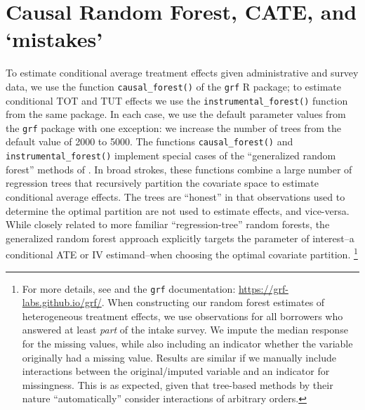 \begin{appendix}
\begin{figure}[!h]
\label{te_rankinvariance}
\end{figure}


\newpage 

\section{ Causal Random Forest, CATE, and `mistakes'}\label{app:cate}


To estimate conditional average treatment effects given administrative and survey data, we use the function \texttt{causal\_forest()} of the \texttt{grf} R package; to estimate conditional TOT and TUT effects we use the \texttt{instrumental\_forest()} function from the same package.
In each case, we use the default parameter values from the \texttt{grf} package with one exception: we increase the number of trees from the default value of 2000 to 5000.
The functions \texttt{causal\_forest()} and \texttt{instrumental\_forest()} implement special cases of the ``generalized random forest'' methods of \cite{atheygrf}.
In broad strokes, these functions combine a large number of regression trees that recursively partition the covariate space to estimate conditional average effects.
The trees are ``honest'' in that observations used to determine the optimal partition are not used to estimate effects, and vice-versa.
While closely related to more familiar ``regression-tree'' random forests, the generalized random forest approach explicitly targets the parameter of interest--a conditional ATE or IV estimand--when choosing the optimal covariate partition.
\footnote{For more details, see \cite{atheygrf} and the \texttt{grf} documentation: \url{https://grf-labs.github.io/grf/}. When constructing our random forest estimates of heterogeneous treatment effects, we use observations for all borrowers who answered at least \emph{part} of the intake survey.
We impute the median response for the missing values, while also including an indicator whether the variable originally had a missing value. Results are similar if we manually include interactions between the original/imputed variable and an indicator for missingness. This is as expected, given that tree-based methods by their nature ``automatically'' consider interactions of arbitrary orders.}


\end{appendix}
